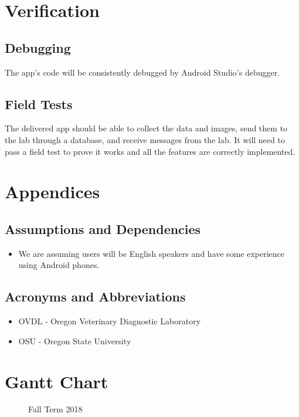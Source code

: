 \documentclass[onecolumn, draftclsnofoot,10pt, compsoc]{IEEEtran}
\begin{document}
\section{Verification}
\subsection{Debugging}
The app's code will be consistently debugged by Android Studio's debugger.

\subsection{Field Tests}
The delivered app should be able to collect the data and images, send them to the lab through a database, and receive messages from the lab. 
It will need to pass a field test to prove it works and all the features are correctly implemented. 

\section{Appendices}
\subsection{Assumptions and Dependencies}
\begin{itemize}
\item We are assuming users will be English speakers and have some experience using Android phones. 
\end{itemize}

\subsection{Acronyms and Abbreviations}
\begin{itemize}
\item OVDL - Oregon Veterinary Diagnostic Laboratory
\item OSU - Oregon State University 
\end{itemize}

\clearpage
\section{Gantt Chart}
\begin{figure}[htp] 
\caption{Fall Term 2018}
\end{figure}

%
 
\end{document}
